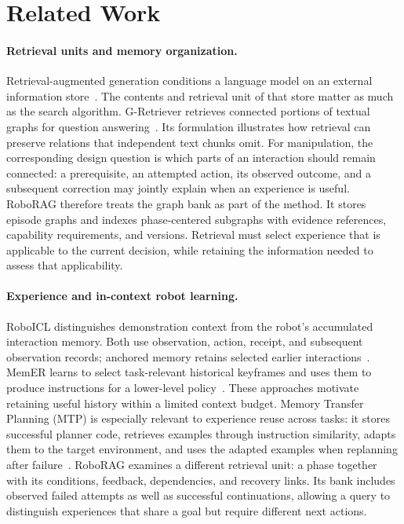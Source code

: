 \section{Related Work}
\label{sec:related}

\paragraph{Retrieval units and memory organization.}
Retrieval-augmented generation conditions a language model on an external information store~\cite{rag2020}. The contents and retrieval unit of that store matter as much as the search algorithm. G-Retriever retrieves connected portions of textual graphs for question answering~\cite{gretriever2024}. Its formulation illustrates how retrieval can preserve relations that independent text chunks omit. For manipulation, the corresponding design question is which parts of an interaction should remain connected: a prerequisite, an attempted action, its observed outcome, and a subsequent correction may jointly explain when an experience is useful. RoboRAG therefore treats the graph bank as part of the method. It stores episode graphs and indexes phase-centered subgraphs with evidence references, capability requirements, and versions. Retrieval must select experience that is applicable to the current decision, while retaining the information needed to assess that applicability.

\paragraph{Experience and in-context robot learning.}
RoboICL distinguishes demonstration context from the robot's accumulated interaction memory. Both use observation, action, receipt, and subsequent observation records; anchored memory retains selected earlier interactions~\cite{roboicl2026}. MemER learns to select task-relevant historical keyframes and uses them to produce instructions for a lower-level policy~\cite{memer2026}. These approaches motivate retaining useful history within a limited context budget. Memory Transfer Planning (MTP) is especially relevant to experience reuse across tasks: it stores successful planner code, retrieves examples through instruction similarity, adapts them to the target environment, and uses the adapted examples when replanning after failure~\cite{mtp2025}. RoboRAG examines a different retrieval unit: a phase together with its conditions, feedback, dependencies, and recovery links. Its bank includes observed failed attempts as well as successful continuations, allowing a query to distinguish experiences that share a goal but require different next actions.

